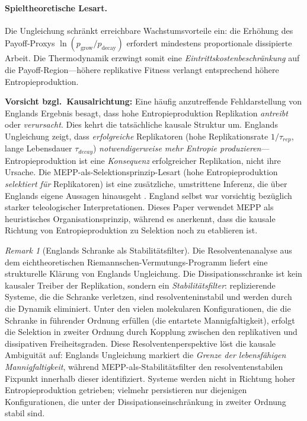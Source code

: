 \documentclass[12pt,a4paper]{article}
\theoremstyle{remark}
\newtheorem{remark}{Remark}
\begin{document}
\paragraph{Spieltheoretische Lesart.} Die Ungleichung schr\"ankt erreichbare Wachstumsvorteile ein: die Erh\"ohung des Payoff-Proxys $\ln(p_{\mathrm{grow}} / p_{\mathrm{decay}})$ erfordert mindestens proportionale dissipierte Arbeit. Die Thermodynamik erzwingt somit eine \emph{Eintrittskostenbeschr\"ankung} auf die Payoff-Region---h\"ohere replikative Fitness verlangt entsprechend h\"ohere Entropieproduktion.

\textbf{Vorsicht bzgl.\ Kausalrichtung:} Eine h\"aufig anzutreffende Fehldarstellung von Englands Ergebnis besagt, dass hohe Entropieproduktion Replikation \emph{antreibt} oder \emph{verursacht}. Dies kehrt die tats\"achliche kausale Struktur um. Englands Ungleichung zeigt, dass \emph{erfolgreiche} Replikatoren (hohe Replikationsrate $1/\tau_{rep}$, lange Lebensdauer $\tau_{decay}$) \emph{notwendigerweise mehr Entropie produzieren}---Entropieproduktion ist eine \emph{Konsequenz} erfolgreicher Replikation, nicht ihre Ursache. Die MEPP-als-Selektionsprinzip-Lesart (hohe Entropieproduktion \emph{selektiert f\"ur} Replikatoren) ist eine zus\"atzliche, umstrittene Inferenz, die \"uber Englands eigene Aussagen hinausgeht \citep{England2013}. England selbst war vorsichtig bez\"uglich starker teleologischer Interpretationen. Dieses Paper verwendet MEPP als heuristisches Organisationsprinzip, w\"ahrend es anerkennt, dass die kausale Richtung von Entropieproduktion zu Selektion noch zu etablieren ist.

\begin{remark}[Englands Schranke als Stabilit\"atsfilter]
\label{rem:england-stability-filter}
Die Resolventenanalyse aus dem eichtheoretischen Riemannschen-Vermutungs-Programm \citep{GeigerRH2026b} liefert eine strukturelle Kl\"arung von Englands Ungleichung. Die Dissipationsschranke ist kein kausaler Treiber der Replikation, sondern ein \emph{Stabilit\"atsfilter}: replizierende Systeme, die die Schranke verletzen, sind resolventeninstabil und werden durch die Dynamik eliminiert. Unter den vielen molekularen Konfigurationen, die die Schranke in f\"uhrender Ordnung erf\"ullen (die entartete Mannigfaltigkeit), erfolgt die Selektion in zweiter Ordnung durch Kopplung zwischen den replikativen und dissipativen Freiheitsgraden. Diese Resolventenperspektive l\"ost die kausale Ambiguit\"at auf: Englands Ungleichung markiert die \emph{Grenze der lebensfähigen Mannigfaltigkeit}, w\"ahrend MEPP-als-Stabilit\"atsfilter den resolventenstabilen Fixpunkt innerhalb dieser identifiziert. Systeme werden nicht in Richtung hoher Entropieproduktion getrieben; vielmehr persistieren nur diejenigen Konfigurationen, die unter der Dissipationseinschr\"ankung in zweiter Ordnung stabil sind.
\end{remark}
\end{document}
